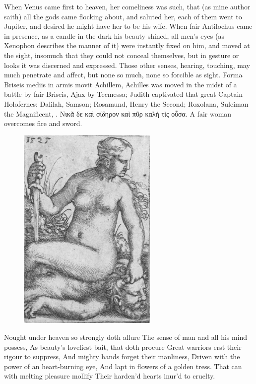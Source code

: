 {When Venus came first to heaven, her comeliness was such, that (as mine
author saith) all the gods came flocking about, and saluted her,
each of them went to Jupiter, and desired he might have her to be his
wife. When fair Antilochus came in presence, as a candle in the
dark his beauty shined, all men's eyes (as Xenophon describes the
manner of it) were instantly fixed on him, and moved at the sight,
insomuch that they could not conceal themselves, but in gesture or
looks it was discerned and expressed. Those other senses, hearing,
touching, may much penetrate and affect, but none so much, none so
forcible as sight. Forma Briseis mediis in armis movit Achillem,
Achilles was moved in the midst of a battle by fair Briseis, Ajax by
Tecmessa; Judith captivated that great Captain Holofernes: Dalilah,
Samson; Rosamund, Henry the Second; Roxolana, Suleiman the
Magnificent, \etc{}.
\textgreek[variant=ancient]{Νικᾶ δε καὶ σίδηρον καὶ πῦρ καλὴ τὶς οὖσα.}
A fair woman overcomes fire and sword.

\begin{figure}[tbh]
  \begingroup
  \centering
  \includegraphics[keepaspectratio,width=0.6\textwidth]{figures/pride-JudithHolofernes-small.jpg}
  \label{fig:judithholofernes}
\end{figure}

Nought under heaven so strongly doth allure
The sense of man and all his mind possess,
As beauty's loveliest bait, that doth procure
Great warriors erst their rigour to suppress,
And mighty hands forget their manliness,
Driven with the power of an heart-burning eye,
And lapt in flowers of a golden tress.
That can with melting pleasure mollify
Their harden'd hearts inur'd to cruelty.

}
